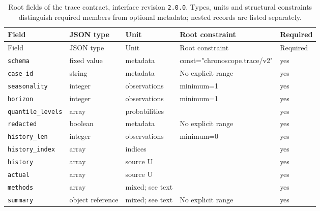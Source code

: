 \begingroup\small
\begin{longtable}{@{}p{}p{}p{}p{}p{}@{}}
\caption{Root fields of the trace contract, interface revision \texttt{2.0.0}. Types, units and structural constraints distinguish required members from optional metadata; nested records are listed separately.}\label{tab:contract-trace}\\
\toprule Field & JSON type & Unit & Root constraint & Required\\\midrule\endfirsthead
\toprule Field & JSON type & Unit & Root constraint & Required\\\midrule\endhead
\texttt{schema} & fixed value & metadata & const="chronosco\allowbreak{}pe.trace/v2" & yes\\
\texttt{case\_\allowbreak{}id} & string & metadata & No explicit range & yes\\
\texttt{seasonality} & integer & observations & minimum=1 & yes\\
\texttt{horizon} & integer & observations & minimum=1 & yes\\
\texttt{quantile\_\allowbreak{}levels} & array & probabilities &  & yes\\
\texttt{redacted} & boolean & metadata & No explicit range & yes\\
\texttt{history\_\allowbreak{}len} & integer & observations & minimum=0 & yes\\
\texttt{history\_\allowbreak{}index} & array & indices &  & yes\\
\texttt{history} & array & source U &  & yes\\
\texttt{actual} & array & source U &  & yes\\
\texttt{methods} & array & mixed; see text &  & yes\\
\texttt{summary} & object reference & mixed; see text & No explicit range & yes\\
\bottomrule
\end{longtable}
\endgroup
